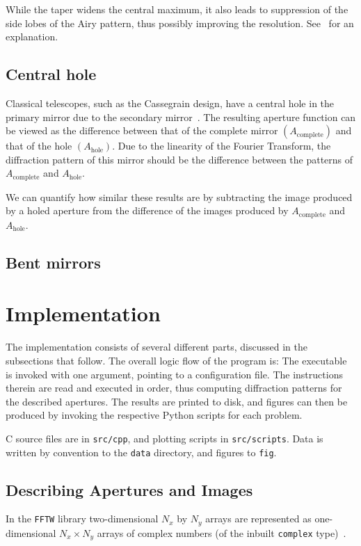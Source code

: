 \documentclass[11pt]{article}
\newcommand{\R}[1]{\mathrm{#1}}
\newcommand{\CC}{{C\nolinebreak[4]\hspace{-.05em}\raisebox{.3ex}{\scriptsize\bf ++}}}
\begin{document}
While the taper widens the central maximum, it also leads to suppression of the side lobes of the Airy pattern, thus possibly improving the resolution. See~\cite[Section~11.3]{hecht} for an explanation.

\subsection{Central hole}\label{sec:analysis:hole}
Classical telescopes, such as the Cassegrain design, have a central hole in the primary mirror due to the secondary mirror~\cite[Section~7.2.3]{RadioAstro}. The resulting aperture function can be viewed as the difference between that of the complete mirror $(A_{\R{complete}})$ and that of the hole $(A_{\R{hole}})$. Due to the linearity of the Fourier Transform, the diffraction pattern of this mirror should be the difference between the patterns of $A_{\R{complete}}$ and $A_{\R{hole}}$.

We can quantify how similar these results are by subtracting the image produced by a holed aperture from the difference of the images produced by $A_{\R{complete}}$ and $A_{\R{hole}}$.

\subsection{Bent mirrors}\label{sec:analysis:bent}



\section{Implementation}\label{sec:impl}
The implementation consists of several different parts, discussed in the subsections that follow. The overall logic flow of the program is:
The executable is invoked with one argument, pointing to a configuration file. The instructions therein are read and executed in order, thus computing diffraction patterns for the described apertures. The results are printed to disk, and figures can then be produced by invoking the respective Python scripts for each problem.

\CC{} source files are in \texttt{src/cpp}, and plotting scripts in \texttt{src/scripts}. Data is written by convention to the \texttt{data} directory, and figures to \texttt{fig}.

\subsection{Describing Apertures and Images}
In the \texttt{FFTW} library two-dimensional $N_x$ by $N_y$ arrays are represented as one-dimensional $N_x \times N_y$ arrays of complex numbers (of the inbuilt \texttt{complex} type)~\cite[Section 3.2]{fftw}.
\end{document}
